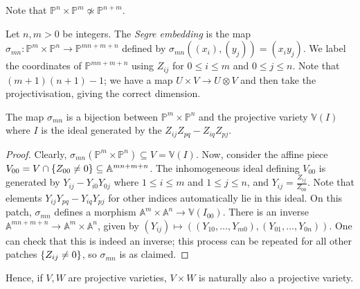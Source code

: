 Note that \( \mathbb P^n \times \mathbb P^m \not\simeq \mathbb P^{n+m} \).
\begin{example}
    Let \( n, m > 0 \) be integers.
    The \emph{Segre embedding} is the map \( \sigma_{mn} \colon \mathbb P^m \times \mathbb P^n \to \mathbb P^{mn+m+n} \) defined by \( \sigma_{mn}((x_i), (y_j)) = (x_i y_j) \).
    We label the coordinates of \( \mathbb P^{mn+m+n} \) using \( Z_{ij} \) for \( 0 \leq i \leq m \) and \( 0 \leq j \leq n \).
    Note that \( (m+1)(n+1) - 1 \); we have a map \( U \times V \to U \otimes V \) and then take the projectivisation, giving the correct dimension.
\end{example}
\begin{theorem}
    The map \( \sigma_{mn} \) is a bijection between \( \mathbb P^m \times \mathbb P^n \) and the projective variety \( \mathbb V(I) \) where \( I \) is the ideal generated by the \( Z_{ij} Z_{pq} - Z_{iq} Z_{pj} \).
\end{theorem}
\begin{proof}
    Clearly, \( \sigma_{mn}(\mathbb P^m \times \mathbb P^n) \subseteq V = \mathbb V(I) \).
    Now, consider the affine piece \( V_{00} = V \cap \qty{Z_{00} \neq 0} \subseteq \mathbb A^{mn+m+n} \).
    The inhomogeneous ideal defining \( V_{00} \) is generated by \( Y_{ij} - Y_{i0} Y_{0j} \) where \( 1 \leq i \leq m \) and \( 1 \leq j \leq n \), and \( Y_{ij} = \frac{Z_{ij}}{Z_{00}} \).
    Note that elements \( Y_{ij} Y_{pq} - Y_{iq} Y_{pj} \) for other indices automatically lie in this ideal.
    On this patch, \( \sigma_{mn} \) defines a morphism \( \mathbb A^m \times \mathbb A^n \to \mathbb V(I_{00}) \).
    There is an inverse \( \mathbb A^{mn+m+n} \to \mathbb A^m \times \mathbb A^n \), given by \( (Y_{ij}) \mapsto ((Y_{10}, \dots, Y_{m0}), (Y_{01}, \dots, Y_{0n})) \).
    One can check that this is indeed an inverse; this process can be repeated for all other patches \( \qty{Z_{ij} \neq 0} \), so \( \sigma_{mn} \) is as claimed.
\end{proof}
Hence, if \( V, W \) are projective varieties, \( V \times W \) is naturally also a projective variety.

